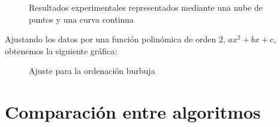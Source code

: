 \documentclass{article}
\begin{document}
\begin{figure}[H]%
    \centering
    \qquad
    \caption{Resultados experimentales representados mediante una nube de puntos y una curva continua}%
    \label{fig:example}%
  \end{figure}

Ajustando los datos por una función polinómica de orden 2, $ax^2+bx + c$, obtenemos la siguiente gráfica:

\begin{figure}[H]%
    \centering
    \caption{Ajuste para la ordenación burbuja}%
    \label{fig:example}%
  \end{figure}
  
 
\section{Comparación entre algoritmos}
\end{document}
